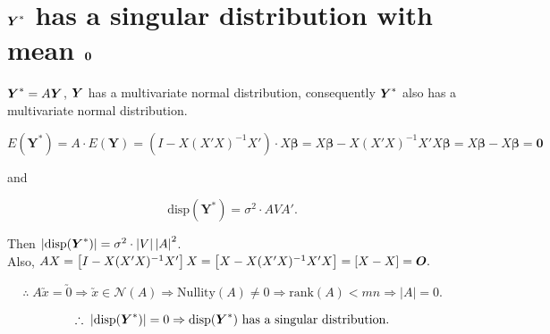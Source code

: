 \section{$\boldsymbol{Y}^*$ has a singular distribution with mean $\boldsymbol{0}$}
\label{app:Y_star_singular}

$\boldsymbol{Y}^* = A\boldsymbol{Y}$, $\boldsymbol{Y}$ has a multivariate normal distribution, consequently $\boldsymbol{Y}^*$ also has a multivariate normal distribution.

$$E(\boldsymbol{Y}^*) = A \cdot E(\boldsymbol{Y}) = (I - X(X'X)^{-1}X') \cdot X\boldsymbol{\beta} = X\boldsymbol{\beta} - X(X'X)^{-1}X'X\boldsymbol{\beta} = X\boldsymbol{\beta} - X\boldsymbol{\beta} = \boldsymbol{0}$$

and

$$\text{disp}(\boldsymbol{Y}^*) = \sigma^2 \cdot AVA'.$$

Then $\left\lvert \text{disp}(\boldsymbol{Y}^*) \right\rvert = \sigma^2 \cdot \left\lvert V \right\rvert \left\lvert A \right\rvert^2$. \\[0.5em]

Also, $AX = \left[ I - X(X'X)^{-1}X' \right]X = \left[ X - X(X'X)^{-1}X'X \right] = \left[ X - X \right] = \boldsymbol{O}.$ 

$$\therefore \; A\utilde{x} = \utilde{0} \Rightarrow \utilde{x} \in \mathcal{N}(A) \Rightarrow \text{Nullity}(A) \neq 0 \Rightarrow \text{rank}(A) < mn \Rightarrow \left\lvert A \right\rvert = 0.$$

$$\therefore \; \left\lvert \text{disp}(\boldsymbol{Y}^*) \right\rvert = 0 \Rightarrow \text{disp}(\boldsymbol{Y}^*) \text{ has a singular distribution.}$$

